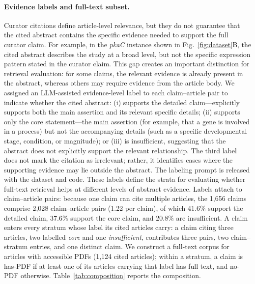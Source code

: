 \documentclass[runningheads]{llncs}
\begin{document}
\paragraph{Evidence labels and full-text subset.}
Curator citations define article-level relevance, but they do not guarantee that 
the cited abstract contains the specific evidence needed to support the full 
curator claim. 
For example, in the \emph{pkaC} instance shown in Fig.~\ref{fig:dataset}B, the cited abstract describes the study at a broad level, but not the specific expression pattern stated in the curator claim.
This gap creates an important distinction for retrieval evaluation: 
for some claims, the relevant evidence is already present in the abstract, whereas others 
may require evidence from the article body. 
We assigned an LLM-assisted evidence-level label to each
claim--article pair to indicate whether the cited abstract: (i) supports the detailed claim---explicitly supports both the main assertion and its relevant specific details;
(ii) supports only the core statement---the main assertion (for example, that a gene is involved in a process) but not the accompanying details (such as a specific developmental stage, condition, or magnitude); or (iii) is insufficient, suggesting that 
the abstract does not explicitly support the relevant relationship. The third label does not mark 
the citation as irrelevant; rather, it identifies cases where the supporting 
evidence may lie outside the abstract. The labeling prompt is released with the dataset and code. These labels define the strata for evaluating whether full-text retrieval helps at different levels of abstract evidence. Labels attach to claim--article pairs: because one claim can cite multiple articles, the 1{,}656 claims comprise 2{,}028 claim--article pairs (1.22 per claim), of which 41.6\% support the detailed claim, 37.6\% support the core claim, and 20.8\% are insufficient. A claim enters every stratum whose label its cited articles carry: a claim citing three articles, two labelled \emph{core} and one \emph{insufficient}, contributes three pairs, two claim--stratum entries, and one distinct claim. We construct a full-text corpus for articles with accessible PDFs (1,124 cited articles); within a stratum, a claim is has-PDF if at least one of its articles carrying that label has full text, and no-PDF otherwise. Table~\ref{tab:composition} reports the composition.
\end{document}
